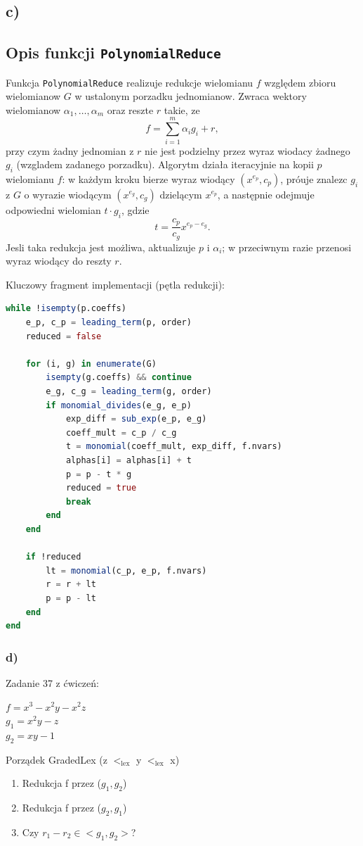 \documentclass[12pt,a4paper]{article}
\begin{document}
\subsection*{c)}

\subsection*{Opis funkcji \texttt{PolynomialReduce}}
Funkcja \texttt{PolynomialReduce} realizuje redukcje wielomianu $f$ względem zbioru wielomianow $G$ w ustalonym porzadku jednomianow. Zwraca wektory wielomianow $\alpha_1,\dots,\alpha_m$ oraz reszte $r$ takie, ze
\[
f = \sum_{i=1}^{m} \alpha_i g_i + r,
\]
przy czym żadny jednomian z $r$ nie jest podzielny przez wyraz wiodacy żadnego $g_i$ (wzgladem zadanego porzadku). Algorytm działa iteracyjnie na kopii $p$ wielomianu $f$: w każdym kroku bierze wyraz wiodący $(x^{e_p}, c_p)$, próuje znalezc $g_i$ z $G$ o wyrazie wiodącym $(x^{e_g}, c_g)$ dzielącym $x^{e_p}$, a następnie odejmuje odpowiedni wielomian $t\cdot g_i$, gdzie
\[
t = \frac{c_p}{c_g} x^{e_p - e_g}.
\]
Jesli taka redukcja jest możliwa, aktualizuje $p$ i $\alpha_i$; w przeciwnym razie przenosi wyraz wiodący do reszty $r$.

Kluczowy fragment implementacji (pętla redukcji):
\begin{lstlisting}[language=Julia]
while !isempty(p.coeffs)
    e_p, c_p = leading_term(p, order)
    reduced = false

    for (i, g) in enumerate(G)
        isempty(g.coeffs) && continue
        e_g, c_g = leading_term(g, order)
        if monomial_divides(e_g, e_p)
            exp_diff = sub_exp(e_p, e_g)
            coeff_mult = c_p / c_g
            t = monomial(coeff_mult, exp_diff, f.nvars)
            alphas[i] = alphas[i] + t
            p = p - t * g
            reduced = true
            break
        end
    end

    if !reduced
        lt = monomial(c_p, e_p, f.nvars)
        r = r + lt
        p = p - lt
    end
end
\end{lstlisting}

\subsubsection*{d)}
Zadanie 37 z ćwiczeń:
\begin{center}
    $f = x^{3} - x^{2}y - x^{2}z$\\
$g_{1} = x^{2}y - z$\\
$g_{2} = xy - 1$
\end{center}
Porządek GradedLex (z $<_{\mathrm{lex}}$ y $<_{\mathrm{lex}}$ x)\\
\begin{enumerate}
    \item Redukcja f przez ($g_{1},g_{2}$)
    \item Redukcja f przez ($g_{2},g_{1}$)
    \item Czy $r_{1} - r_{2} \in <g_{1},g_{2}>$?
\end{enumerate}
\end{document}
